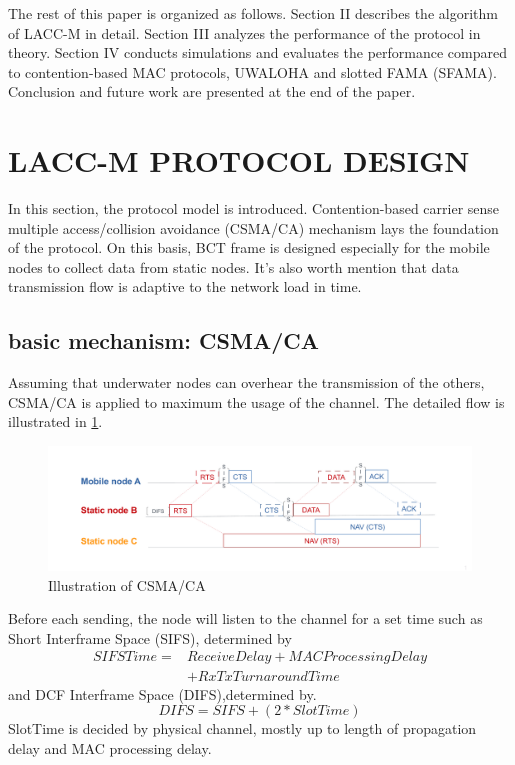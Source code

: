 \documentclass[conference]{IEEEtran}
\begin{document}
The rest of this paper is organized as follows. Section II describes the algorithm of LACC-M in detail. Section III analyzes the performance of the protocol in theory. Section IV conducts simulations and evaluates the performance compared to contention-based MAC protocols, UWALOHA and slotted FAMA (SFAMA). Conclusion and future work are presented at the end of the paper.

\section{LACC-M PROTOCOL DESIGN}

In this section, the protocol model is introduced. Contention-based carrier sense multiple access/collision avoidance (CSMA/CA) mechanism lays the foundation of the protocol. On this basis, BCT frame is designed especially for the mobile nodes to collect data from static nodes. It's also worth mention that data transmission flow is adaptive to the network load in time.

\subsection{basic mechanism: CSMA/CA}

Assuming that underwater nodes can overhear the transmission of the others, CSMA/CA is applied to maximum the usage of the channel. The detailed flow is illustrated in \ref{f1}. 
\begin{figure}[ht]
	\centerline{\includegraphics[scale=0.15]{figures/1.pdf}}
	\caption{Illustration of CSMA/CA}
	\label{f1}
\end{figure}
Before each sending, the node will listen to the channel for a set time such as Short Interframe Space (SIFS), determined by 
\begin{equation*}
\begin{aligned}
SIFSTime=&ReceiveDelay+MACProcessingDelay\\&+RxTxTurnaroundTime
\end{aligned}
\end{equation*} 
and DCF Interframe Space (DIFS),determined by. 
\begin{equation*}
DIFS=SIFS+(2*SlotTime)
\end{equation*}
SlotTime is decided by physical channel, mostly up to length of propagation delay and MAC processing delay.
\end{document}
